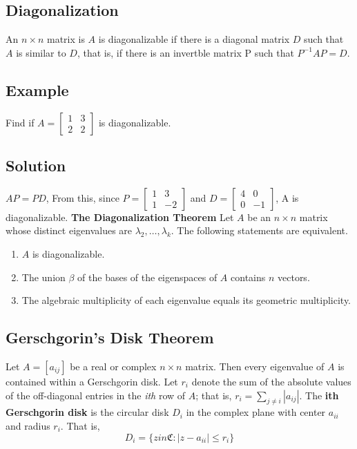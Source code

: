 \subsection*{Diagonalization}
An $n\times n$ matrix is $A$ is diagonalizable if there is a diagonal matrix $D$ such that $A$ is similar to $D$, that is, if there is an invertble matrix P such that $P^{-1}AP = D$.

\subsection*{Example}
Find if $A = \begin{bmatrix}
    1&3\\2&2
\end{bmatrix}$ is diagonalizable.
\subsection*{Solution}
$AP = PD$, From this, since $P = \begin{bmatrix}
    1&3\\1&-2
\end{bmatrix}$ and $D = \begin{bmatrix}
    4&0\\0&-1
\end{bmatrix}$, A is diagonalizable.
\textbf{The Diagonalization Theorem}
Let $A$ be an $n\times n$ matrix whose distinct eigenvalues are $\lambda_2, \dots, \lambda_k$. The following statements are equivalent.
\begin{enumerate}[a]
    \item $A$ is diagonalizable.
    \item The union $\beta$ of the bases of the eigenspaces of $A$ contains $n$ vectors.
    \item The algebraic multiplicity of each eigenvalue equals its geometric multiplicity.
\end{enumerate}

\subsection*{Gerschgorin's Disk Theorem}
Let $A = [a_{ij}]$ be a real or complex $n\times n$ matrix. Then every eigenvalue of $A$ is contained within a Gerschgorin disk.
Let $r_i$ denote the sum of the absolute values of the off-diagonal entries in the \textit{ith} row of $A$; that is, $r_i = \sum_{j\neq i}|a_{ij}|$. The \textbf{ith Gerschgorin disk} is the circular disk $D_i$ in the complex plane with center $a_{ii}$ and radius $r_i$. That is,
$$D_i = \{z in \mathfrak{C}:|z-a_{ii}| \leq r_i\}$$

